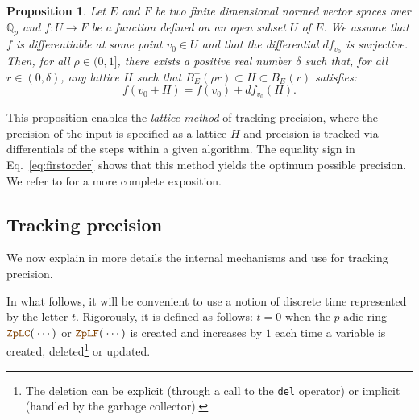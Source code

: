 \documentclass[sigconf]{acmart}
\newcommand{\Z}{\mathbb Z}
\newcommand{\Zp}{\Z_p}
\newcommand{\Q}{\mathbb Q}
\newcommand{\Qp}{\Q_p}
\newcommand{\ZpLC}{\text{\color{output} \rm \tt ZpLC}\xspace}
\newcommand{\ZpLF}{\text{\color{output} \rm \tt ZpLF}\xspace}
\newtheorem{prop}[theo]{Proposition}
\theoremstyle{definition}
\begin{document}
\begin{prop}
\label{prop:precision}
Let $E$ and $F$ be two finite dimensional normed vector spaces over $\Qp$ 
and $f : U \rightarrow F$ be a function defined on an open subset $U$ of 
$E$. We assume that $f$ is differentiable at some point $v_0 \in U$ and 
that the differential $df_{v_0}$ is surjective.
Then, for all $\rho \in (0, 1]$, there exists a positive real
number $\delta$ such that, for all $r \in (0, \delta)$, any lattice
$H$ such that $B^-_E(\rho r) \subset H \subset B^{\phantom -}_E(r)$ 
satisfies:
\begin{equation}
\label{eq:firstorder}
f(v_0 + H) = f(v_0) + df_{v_0} (H).
\end{equation}
\end{prop}

This proposition enables the \emph{lattice method} of tracking precision,
where the precision of the input is specified as a lattice $H$ and precision
is tracked via differentials of the steps within a given algorithm.
The equality sign in Eq.~\eqref{eq:firstorder} shows that this method
yields the optimum possible precision. 
We refer to \cite[\S 4.1]{caruso-roe-vaccon:14a} for a more complete 
exposition.

%

\subsection{Tracking precision}
\label{ssec:trackprec}

We now explain in more details the internal mechanisms \ZpLC and \ZpLF 
use for tracking precision. 

In what follows, it will be convenient to use a notion of discrete time 
represented by the letter $t$. Rigorously, it is defined as follows: 
$t=0$ when the $p$-adic ring $\ZpLC(\:\cdots)$ or $\ZpLF(\:\cdots)$ is 
created and increases by $1$ each time a variable is created, 
deleted\footnote{The deletion can be explicit (through a call to the 
\texttt{del} operator) or implicit (handled by the garbage collector).} 
or updated.
\end{document}
